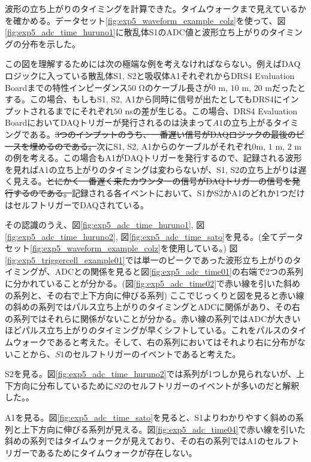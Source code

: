 \documentclass[../../main.tex]{subfiles}
\numberwithin{equation}{section}
\numberwithin{table}{section}
\numberwithin{figure}{section}
\begin{document}
    波形の立ち上がりのタイミングを計算できた。タイムウォークまで見えているかを確かめる。データセット\ref{fig:exp5_waveform_example_colz}を使って、図\ref{fig:exp5_adc_time_huruno1}に散乱体S1のADC値と波形立ち上がりのタイミングの分布を示した。
    
    この図を理解するためには次の極端な例を考えなければならない。例えばDAQロジックに入っている散乱体S1, S2と吸収体A1それぞれからDRS4 Evaluation Boardまでの特性インピーダンス$50$ \si{\ohm}のケーブル長さが$0$ m, $10$ m, $20$ mだったとする。この場合、もしもS1, S2, A1から同時に信号が出たとしてもDRS4にインプットされるまでにそれぞれ$50$ nsの差が生じる。この場合、DRS4 Evaluation BoardにおいてDAQトリガーが発行されるのは決まって$A1$の立ち上がるタイミングである。\sout{3つのインプットのうち、一番遅い信号がDAQロジックの最後のピースを埋めるのである。}次にS1, S2, A1からのケーブルがそれぞれ$0$m, $1$ m, $2$ mの例を考える。この場合もA1がDAQトリガーを発行するので、記録される波形を見ればA1の立ち上がりのタイミングは変わらないが、S1, S2の立ち上がりは遅く見える。\sout{とにかく一番遅く来たカウンターの信号がDAQトリガーの信号を発行するのである。}記録される各イベントにおいて、S1かS2かA1のどれか1つだけはセルフトリガーでDAQされている。
    
    その認識のうえ、図\ref{fig:exp5_adc_time_huruno1}, 図\ref{fig:exp5_adc_time_huruno2}, 図\ref{fig:exp5_adc_time_sato}を見る。(全てデータセット\ref{fig:exp5_waveform_example_colz}を使用している。) 図\ref{fig:exp5_triggercell_example01}では単一のピークであった波形立ち上がりのタイミングが、ADCとの関係を見ると図\ref{fig:exp5_adc_time01}の右端で2つの系列に分かれていることが分かる。(図\ref{fig:exp5_adc_time02}で赤い線を引いた斜めの系列と、その右で上下方向に伸びる系列) ここでじっくりと図を見ると赤い線の斜めの系列ではパルス立ち上がりのタイミングとADCに関係があり、その右の系列ではそれらに関係がないことが分かる。赤い線の系列ではADCが大きいほどパルス立ち上がりのタイミングが早くシフトしている。これをパルスのタイムウォークであると考えた。そして、右の系列においてはそれより右に分布がないことから、$S1$のセルフトリガーのイベントであると考えた。

    S2を見る。図\ref{fig:exp5_adc_time_huruno2}では系列が1つしか見られないが、上下方向に分布しているために$S2$のセルフトリガーのイベントが多いのだと解釈した。。

    A1を見る。図\ref{fig:exp5_adc_time_sato}を見ると、S1よりわかりやすく斜めの系列と上下方向に伸びる系列が見える。図\ref{fig:exp5_adc_time04}で赤い線を引いた斜めの系列ではタイムウォークが見えており、その右の系列ではA1のセルフトリガーであるためにタイムウォークが存在しない。
\end{document}
